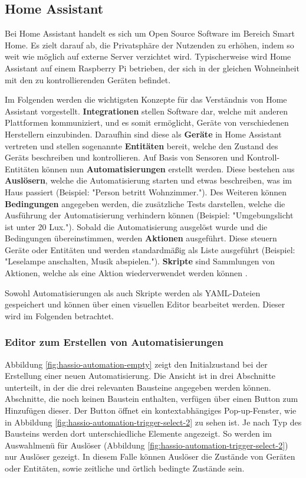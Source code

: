 \newcommand{\hascwidth}{.49\textwidth}
\subsection{Home Assistant}
\label{sec:home-assistant}

Bei Home Assistant handelt es sich um Open Source Software im Bereich Smart Home. Es zielt darauf ab, die Privatsphäre der Nutzenden zu erhöhen, indem so weit wie möglich auf externe Server verzichtet wird. Typischerweise wird Home Assistant auf einem Raspberry Pi betrieben, der sich in der gleichen Wohneinheit mit den zu kontrollierenden Geräten befindet.
\parencite{openhomefoundationHomeAssistant}

Im Folgenden werden die wichtigsten Konzepte für das Verständnis von Home Assistant vorgestellt. \textbf{Integrationen} stellen Software dar, welche mit anderen Plattformen kommuniziert, und es somit ermöglicht, Geräte von verschiedenen Herstellern einzubinden. Daraufhin sind diese als \textbf{Geräte} in Home Assistant vertreten und stellen sogenannte \textbf{Entitäten} bereit, welche den Zustand des Geräts beschreiben und kontrollieren. Auf Basis von Sensoren und Kontroll-Entitäten können nun \textbf{Automatisierungen} erstellt werden. Diese bestehen aus \textbf{Auslösern}, welche die Automatisierung starten und etwas beschreiben, was im Haus passiert (Beispiel: "Person betritt Wohnzimmer."). Des Weiteren können \textbf{Bedingungen} angegeben werden, die zusätzliche Tests darstellen, welche die Ausführung der Automatisierung verhindern können (Beispiel: "Umgebungslicht ist unter 20 Lux."). Sobald die Automatisierung ausgelöst wurde und die Bedingungen übereinstimmen, werden \textbf{Aktionen} ausgeführt. Diese steuern Geräte oder Entitäten und werden standardmäßig als Liste ausgeführt (Beispiel: "Leselampe anschalten, Musik abspielen."). \textbf{Skripte} sind Sammlungen von Aktionen, welche als eine Aktion wiederverwendet werden können \parencite{openhomefoundationConceptsTerminology}.

Sowohl Automatisierungen als auch Skripte werden als \ac{YAML}-Dateien gespeichert und können über einen visuellen Editor bearbeitet werden. Dieser wird im Folgenden betrachtet.

\subsubsection{Editor zum Erstellen von Automatisierungen}
Abbildung \ref{fig:hassio-automation-empty} zeigt den Initialzustand bei der Erstellung einer neuen Automatisierung. Die Ansicht ist in drei Abschnitte unterteilt, in der die drei relevanten Bausteine angegeben werden können. Abschnitte, die noch keinen Baustein enthalten, verfügen über einen Button zum Hinzufügen dieser. Der Button öffnet ein kontextabhängiges Pop-up-Fenster, wie in Abbildung \ref{fig:hassio-automation-trigger-select-2} zu sehen ist. Je nach Typ des Bausteins werden dort unterschiedliche Elemente angezeigt. So werden im Auswahlmenü für Auslöser (Abbildung \ref{fig:hassio-automation-trigger-select-2}) nur Auslöser gezeigt. In diesem Falle können Auslöser die Zustände von Geräten oder Entitäten, sowie zeitliche und örtlich bedingte Zustände sein.

